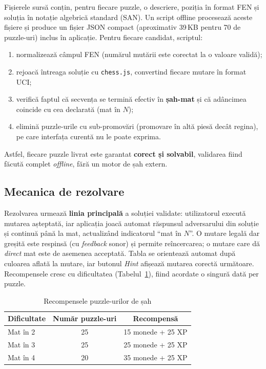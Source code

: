 \documentclass[12pt, a4paper, twoside]{report}
\numberwithin{equation}{section}
\begin{document}
Fișierele sursă conțin, pentru fiecare puzzle, o descriere, poziția în format FEN și soluția
în notație algebrică standard (SAN). Un script offline procesează aceste fișiere și produce
un fișier JSON compact (aproximativ 39\,KB pentru 70 de puzzle-uri) inclus în aplicație.
Pentru fiecare candidat, scriptul:
\begin{enumerate}
  \item normalizează câmpul FEN (numărul mutării este corectat la o valoare validă);
  \item rejoacă întreaga soluție cu \texttt{chess.js}, convertind fiecare mutare în format
    UCI;
  \item verifică faptul că secvența se termină efectiv în \textbf{șah-mat} și că adâncimea
    coincide cu cea declarată (mat în $N$);
  \item elimină puzzle-urile cu sub-promovări (promovare în altă piesă decât regina), pe care
    interfața curentă nu le poate exprima.
\end{enumerate}
Astfel, fiecare puzzle livrat este garantat \textbf{corect și solvabil}, validarea fiind
făcută complet \textit{offline}, fără un motor de șah extern.

\subsection{Mecanica de rezolvare}

Rezolvarea urmează \textbf{linia principală} a soluției validate: utilizatorul execută
mutarea așteptată, iar aplicația joacă automat răspunsul adversarului din soluție și continuă
până la mat, actualizând indicatorul ``mat în $N$''. O mutare legală dar greșită este
respinsă (cu \textit{feedback} sonor) și permite reîncercarea; o mutare care dă \emph{direct}
mat este de asemenea acceptată. Tabla se orientează automat după culoarea aflată la mutare,
iar butonul \textit{Hint} afișează mutarea corectă următoare. Recompensele cresc cu
dificultatea (Tabelul~\ref{tab:puzzle_rewards}), fiind acordate o singură dată per puzzle.

\begin{table}[H]
\centering
\caption{Recompensele puzzle-urilor de șah}
\label{tab:puzzle_rewards}
\begin{tabular}{lcc}
\toprule
\textbf{Dificultate} & \textbf{Număr puzzle-uri} & \textbf{Recompensă} \\
\midrule
Mat în 2 & 25 & 15 monede + 25 XP \\
Mat în 3 & 25 & 25 monede + 25 XP \\
Mat în 4 & 20 & 35 monede + 25 XP \\
\bottomrule
\end{tabular}
\end{table}
\end{document}
